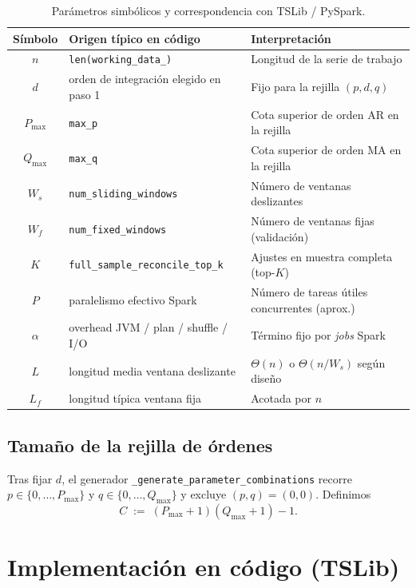 \documentclass[11pt,a4paper]{article}
\begin{document}
\begin{table}[htbp]
  \centering
  \caption{Parámetros simbólicos y correspondencia con TSLib / PySpark.}
  \label{tab:notation}
  \begin{tabular}{@{}clp{6.8cm}@{}}
    \toprule
    Símbolo & Origen típico en código & Interpretación \\
    \midrule
    $n$ & \texttt{len(working\_data\_)} & Longitud de la serie de trabajo \\
    $d$ & orden de integración elegido en paso 1 & Fijo para la rejilla $(p,d,q)$ \\
    $P_{\max}$ & \texttt{max\_p} & Cota superior de orden AR en la rejilla \\
    $Q_{\max}$ & \texttt{max\_q} & Cota superior de orden MA en la rejilla \\
    $W_s$ & \texttt{num\_sliding\_windows} & Número de ventanas deslizantes \\
    $W_f$ & \texttt{num\_fixed\_windows} & Número de ventanas fijas (validación) \\
    $K$ & \texttt{full\_sample\_reconcile\_top\_k} & Ajustes en muestra completa (top-$K$) \\
    $P$ & paralelismo efectivo Spark & Número de tareas útiles concurrentes (aprox.) \\
    $\alpha$ & overhead JVM / plan / shuffle / I/O & Término fijo por \emph{jobs} Spark \\
    $L$ & longitud media ventana deslizante & $\Theta(n)$ o $\Theta(n/W_s)$ según diseño \\
    $L_f$ & longitud típica ventana fija & Acotada por $n$ \\
    \bottomrule
  \end{tabular}
\end{table}

\subsection{Tamaño de la rejilla de órdenes}

Tras fijar $d$, el generador \texttt{\_generate\_parameter\_combinations} recorre
$p \in \{0,\ldots,P_{\max}\}$ y $q \in \{0,\ldots,Q_{\max}\}$ y excluye $(p,q)=(0,0)$.
Definimos
\begin{equation}
  \label{eq:C}
  C \;:=\; (P_{\max}+1)(Q_{\max}+1) - 1 .
\end{equation}

\section{Implementación en código (TSLib)}
\end{document}
